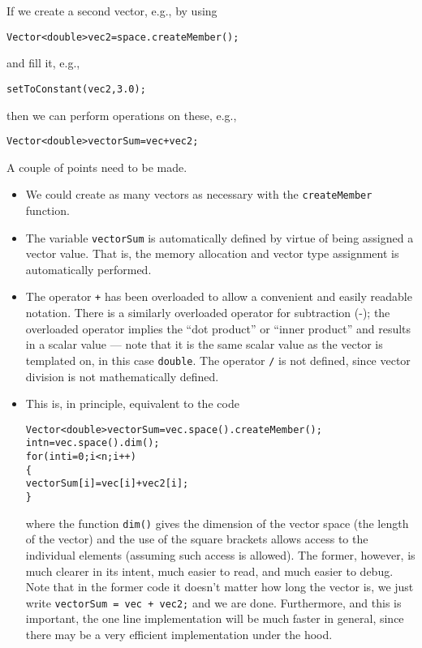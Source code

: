\documentclass[12pt]{article}
\newcommand{\template}{{\sf template}}
\newcommand{\double}{{\tt double}}
\newcommand{\lcode}[1]{{\tt #1}}
\newenvironment{dcode}{  \begin{center} 
    \begin{minipage}{.9\textwidth}
     \begin{alltt}}
{\end{alltt}
    \end{minipage}
  \end{center}}
\newcommand{\bdcode}{\begin{dcode}}
\newcommand{\edcode}{\end{dcode}}
\begin{document}
If we create a second vector, e.g., by using
\bdcode
Vector<double> vec2 = space.createMember();
\edcode 
and fill it, e.g., 
\bdcode
setToConstant(vec2, 3.0);
\edcode
 then we can perform operations on these, e.g.,
\bdcode
Vector<double> vectorSum = vec + vec2;
\edcode
A couple of points need to be made.  
\begin{itemize}
    \item We could create as many
vectors as necessary with the \lcode{createMember} function.  
  \item The variable \lcode{vectorSum} is automatically defined by virtue of
being assigned a vector value.  That is, the memory allocation and
vector type assignment is automatically performed.  
  \item The
operator \lcode{+} has been overloaded to allow a convenient and
easily readable notation. There is a similarly overloaded operator for
subtraction (-); the overloaded operator \lcode{*} implies the ``dot
product'' or ``inner product'' and results in a scalar value --- note
that it is the same scalar value as the vector is \template d on, in
this case \double.  The operator \lcode{/} is not defined, since
vector division is not mathematically defined.  
    \item This is, in principle,  equivalent to the code
        \bdcode
Vector<double> vectorSum = vec.space().createMember();
int n = vec.space().dim(); 
for (int i = 0; i < n; i++) 
  \{ 
    vectorSum[i] = vec[i] + vec2[i]; 
  \}
\edcode
where the function \lcode{dim()} gives the dimension of the vector
space (the length of the vector) and the use of the square brackets
allows access to the individual elements (assuming such access is
allowed). 
The former, however, is much clearer in its intent, much easier to read, and
much easier to debug. Note that in the former code it doesn't matter how
long the vector is, we just write \lcode{vectorSum = vec + vec2;} and we are
done.  Furthermore, and this is important, the one line implementation
will be much faster in general, since there may be a very efficient
implementation under the hood. 

\end{itemize}
\end{document}
